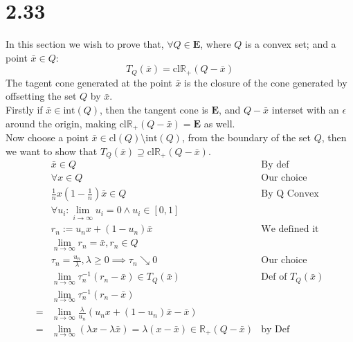 \documentclass[]{article}
\begin{document}
\section*{2.33}\label{2.33}
    In this section we wish to prove that, $\forall Q \in \mathbf{E}$, where $Q$ is a convex set; and a point $\bar{x} \in Q$: 
    $$
        T_Q(\bar{x}) = \text{cl} \mathbb{R}_+( Q - \bar{x})
    $$
    The tagent cone generated at the point $\bar{x}$ is the closure of the cone generated by offsetting the set $Q$ by $\bar{x}$. 
    \\
    Firstly if $\bar{x}\in \text{int}(Q)$, then the tangent cone is $\mathbf{E}$, and $Q - \bar{x}$ interset with an $\epsilon$ around the origin, making $\text{cl}\mathbb{R}_+(Q - \bar{x}) = \mathbf{E}$ as well. 
    \\
    Now choose a point $\bar{x}\in \text{cl}(Q)\setminus \text{int}(Q)$, from the boundary of the set $Q$, then we want to show that $T_Q(\bar{x}) \supseteq \text{cl}\mathbb{R}_+(Q - \bar{x})$. 
    \\
    \begin{align*}\tag{2.33.1}\label{eqn:2.33.1}
        &\bar{x} \in Q & \text{By def}
        \\
        &\forall x\in Q & \text{Our choice}
        \\
        & \frac{1}{n}x \left(1 - \frac{1}{n}\right) \bar{x} \in Q & \text{By Q Convex}
        \\
        & \forall u_i: \lim_{i\rightarrow \infty} u_i = 0 \wedge u_i \in [0, 1] & 
        \\
        & r_n := u_n x + (1 - u_n)\bar{x} & \text{We defined it}
        \\
        & \lim_{n\rightarrow \infty} r_n = \bar{x}, r_n \in Q & 
        \\
        & \tau_n = \frac{u_n}{\lambda}, \lambda \ge 0  \implies \tau_n \searrow 0 & \text{Our choice}
        \\
        & \lim_{n \rightarrow \infty} \tau_n^{-1}(r_n -\bar{x}) \in T_Q(\bar{x}) & \text{Def of } T_Q(\bar{x})
        \\
        & \lim_{n \rightarrow \infty} \tau_n^{-1}(r_n -\bar{x}) & 
        \\
        =& \lim_{n\rightarrow \infty} \frac{\lambda}{u_n} (u_n x + (1 - u_n)\bar{x} - \bar{x})&
        \\
        =& \lim_{n\rightarrow \infty} (\lambda x - \lambda \bar{x}) = \lambda(x - \bar{x})\in \mathbb{R}_+(Q - \bar{x}) & \text{by Def}
    \end{align*}
\end{document}
